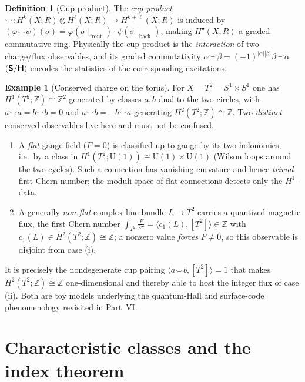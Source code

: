 \documentclass[12pt]{article}
\theoremstyle{definition}
\newtheorem{definition}[definition]{Definition}
\newtheorem{example}[example]{Example}
\theoremstyle{remark}
\newcommand{\Zm}{\mathbb{Z}}
\newcommand{\Umone}{\mathrm{U}(1)}
\newcommand{\Sfont}{\textnormal{\sffamily\bfseries S}}
\newcommand{\Hfont}{\textnormal{\sffamily\bfseries H}}
\begin{document}
\begin{definition}[Cup product]
\label{def:cup}
The \emph{cup product} $\smile\colon H^k(X;R)\otimes H^\ell(X;R)\to H^{k+\ell}(X;R)$
is induced by $(\varphi\smile\psi)(\sigma)=\varphi(\sigma\!\mid_{\text{front}})\cdot
\psi(\sigma\!\mid_{\text{back}})$, making $H^\bullet(X;R)$ a graded-commutative
ring. Physically the cup product is the \emph{interaction} of two charge/flux
observables, and its graded commutativity $\alpha\smile\beta=(-1)^{|\alpha||\beta|}\beta\smile\alpha$
$(\Sfont/\Hfont)$ encodes the statistics of the corresponding excitations.
\end{definition}

\begin{example}[Conserved charge on the torus]
\label{ex:torus}
For $X=T^2=S^1\times S^1$ one has $H^1(T^2;\Zm)\cong\Zm^2$ generated by classes
$a,b$ dual to the two circles, with $a\smile a=b\smile b=0$ and $a\smile b=-b\smile a$
generating $H^2(T^2;\Zm)\cong\Zm$. Two \emph{distinct} conserved observables live
here and must not be confused.
\begin{enumerate}
  \item[(i)] A \emph{flat} gauge field ($F=0$) is classified up to gauge by its
    two holonomies, i.e.\ by a class in $H^1(T^2;\Umone)\cong\Umone\times\Umone$
    (Wilson loops around the two cycles). Such a connection has vanishing
    curvature and hence \emph{trivial} first Chern number; the moduli space of
    flat connections detects only the $H^1$-data.
  \item[(ii)] A generally \emph{non-flat} complex line bundle $L\to T^2$ carries a
    quantized magnetic flux, the first Chern number
    $\int_{T^2}\tfrac{F}{2\pi}=\langle c_1(L),[T^2]\rangle\in\Zm$ with
    $c_1(L)\in H^2(T^2;\Zm)\cong\Zm$; a nonzero value \emph{forces} $F\neq 0$, so
    this observable is disjoint from case (i).
\end{enumerate}
It is precisely the nondegenerate cup pairing
$\langle a\smile b,[T^2]\rangle=1$ that makes $H^2(T^2;\Zm)\cong\Zm$
one-dimensional and thereby able to host the integer flux of case (ii). Both are
toy models underlying the quantum-Hall and surface-code phenomenology revisited in
Part~VI.
\end{example}

\section{Characteristic classes and the index theorem}
\label{sec:char}
\end{document}
